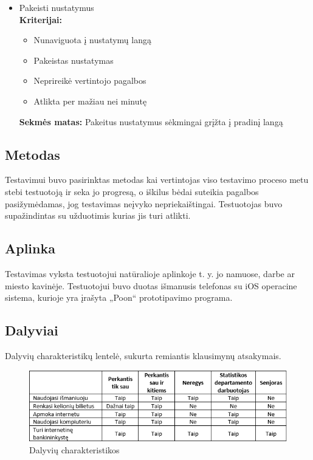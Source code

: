 \documentclass{VUMIFPSkursinis}
\begin{document}
\begin{itemize}
\item Pakeisti nustatymus  \\
	\textbf{Kriterijai:}
	\begin{itemize}
	\item Nunaviguota į nustatymų langą
	\item Pakeistas nustatymas
	\item Neprireikė vertintojo pagalbos
	\item Atlikta per mažiau nei minutę
	\end{itemize}
	\textbf{Sekmės matas:} Pakeitus nustatymus sėkmingai grįžta į pradinį langą \\
\end{itemize}

\subsection{Metodas}
Testavimui buvo pasirinktas metodas kai vertintojas viso testavimo proceso metu stebi testuotoją ir seka jo progresą, o iškilus bėdai suteikia pagalbos pasižymėdamas, jog testavimas neįvyko nepriekaištingai. Testuotojas buvo supažindintas su užduotimis kurias jis turi atlikti.

\subsection{Aplinka}
Testavimas vyksta testuotojui natūralioje aplinkoje t. y. jo namuose, darbe ar miesto kavinėje. Testuotojui buvo duotas išmanusis telefonas su iOS operacine sistema, kurioje yra įrašyta  „Poon“ prototipavimo programa.

\subsection{Dalyviai}

Dalyvių charakteristikų lentelė, sukurta remiantis klausimynų atsakymais.
\begin{figure}[H]
    \centering
    \includegraphics[scale=1]{img/lentele.png}
    \caption{Dalyvių charakteristikos}
    \label{img:dch}
\end{figure}
\end{document}
